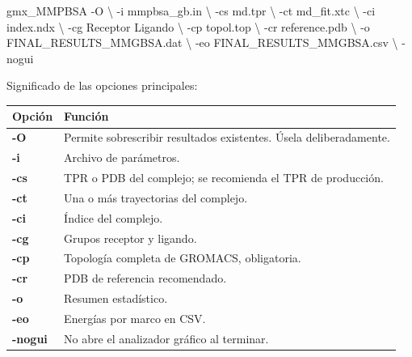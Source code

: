 \documentclass[
  spanish,
  11pt,
  a4paper]{article}
\newenvironment{Shaded}{\begin{snugshade}}{\end{snugshade}}
\newcommand{\AttributeTok}[1]{\textcolor[rgb]{0.13,0.29,0.53}{#1}}
\newcommand{\DataTypeTok}[1]{\textcolor[rgb]{0.13,0.29,0.53}{#1}}
\newcommand{\ExtensionTok}[1]{#1}
\newcommand{\NormalTok}[1]{#1}
\newcounter{none} %
\begin{document}
\begin{Shaded}
\begin{Highlighting}[]
\ExtensionTok{gmx\_MMPBSA} \AttributeTok{{-}O} \DataTypeTok{\textbackslash{}}
    \AttributeTok{{-}i}\NormalTok{ mmpbsa\_gb.in }\DataTypeTok{\textbackslash{}}
    \AttributeTok{{-}cs}\NormalTok{ md.tpr }\DataTypeTok{\textbackslash{}}
    \AttributeTok{{-}ct}\NormalTok{ md\_fit.xtc }\DataTypeTok{\textbackslash{}}
    \AttributeTok{{-}ci}\NormalTok{ index.ndx }\DataTypeTok{\textbackslash{}}
    \AttributeTok{{-}cg}\NormalTok{ Receptor Ligando }\DataTypeTok{\textbackslash{}}
    \AttributeTok{{-}cp}\NormalTok{ topol.top }\DataTypeTok{\textbackslash{}}
    \AttributeTok{{-}cr}\NormalTok{ reference.pdb }\DataTypeTok{\textbackslash{}}
    \AttributeTok{{-}o}\NormalTok{ FINAL\_RESULTS\_MMGBSA.dat }\DataTypeTok{\textbackslash{}}
    \AttributeTok{{-}eo}\NormalTok{ FINAL\_RESULTS\_MMGBSA.csv }\DataTypeTok{\textbackslash{}}
    \AttributeTok{{-}nogui}
\end{Highlighting}
\end{Shaded}

Significado de las opciones principales:

{\def\LTcaptype{none} %
\begin{longtable}[]{@{}
  >{\raggedright\arraybackslash}p{}
  >{\raggedright\arraybackslash}p{}@{}}
\toprule\noalign{}
\begin{minipage}[b]{\linewidth}\raggedright
Opción
\end{minipage} & \begin{minipage}[b]{\linewidth}\raggedright
Función
\end{minipage} \\
\midrule\noalign{}
\endhead
\bottomrule\noalign{}
\endlastfoot
\textbf{-O} & Permite sobrescribir resultados existentes. Úsela
deliberadamente. \\
\textbf{-i} & Archivo de parámetros. \\
\textbf{-cs} & TPR o PDB del complejo; se recomienda el TPR de
producción. \\
\textbf{-ct} & Una o más trayectorias del complejo. \\
\textbf{-ci} & Índice del complejo. \\
\textbf{-cg} & Grupos receptor y ligando. \\
\textbf{-cp} & Topología completa de GROMACS, obligatoria. \\
\textbf{-cr} & PDB de referencia recomendado. \\
\textbf{-o} & Resumen estadístico. \\
\textbf{-eo} & Energías por marco en CSV. \\
\textbf{-nogui} & No abre el analizador gráfico al terminar. \\
\end{longtable}
}
\end{document}
